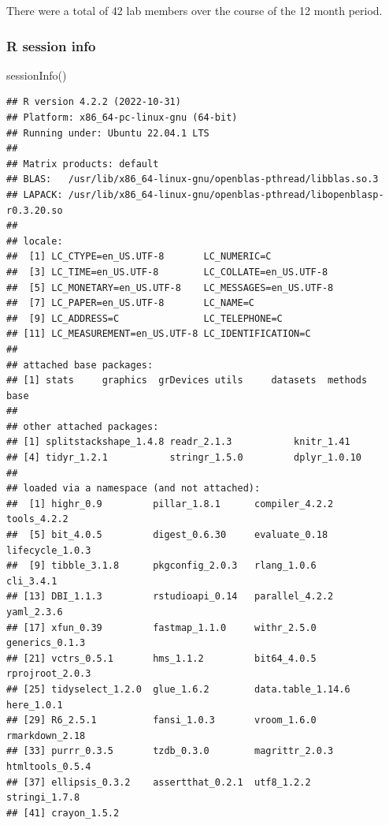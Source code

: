 \documentclass[
]{article}
\newenvironment{Shaded}{\begin{snugshade}}{\end{snugshade}}
\newcommand{\FunctionTok}[1]{\textcolor[rgb]{0.00,0.00,0.00}{#1}}
\newcommand{\NormalTok}[1]{#1}
\begin{document}
There were a total of 42 lab members over the course of the 12 month
period.

\hypertarget{r-session-info}{%
\subsubsection{R session info}\label{r-session-info}}

\begin{Shaded}
\begin{Highlighting}[]
\FunctionTok{sessionInfo}\NormalTok{()}
\end{Highlighting}
\end{Shaded}

\begin{verbatim}
## R version 4.2.2 (2022-10-31)
## Platform: x86_64-pc-linux-gnu (64-bit)
## Running under: Ubuntu 22.04.1 LTS
## 
## Matrix products: default
## BLAS:   /usr/lib/x86_64-linux-gnu/openblas-pthread/libblas.so.3
## LAPACK: /usr/lib/x86_64-linux-gnu/openblas-pthread/libopenblasp-r0.3.20.so
## 
## locale:
##  [1] LC_CTYPE=en_US.UTF-8       LC_NUMERIC=C              
##  [3] LC_TIME=en_US.UTF-8        LC_COLLATE=en_US.UTF-8    
##  [5] LC_MONETARY=en_US.UTF-8    LC_MESSAGES=en_US.UTF-8   
##  [7] LC_PAPER=en_US.UTF-8       LC_NAME=C                 
##  [9] LC_ADDRESS=C               LC_TELEPHONE=C            
## [11] LC_MEASUREMENT=en_US.UTF-8 LC_IDENTIFICATION=C       
## 
## attached base packages:
## [1] stats     graphics  grDevices utils     datasets  methods   base     
## 
## other attached packages:
## [1] splitstackshape_1.4.8 readr_2.1.3           knitr_1.41           
## [4] tidyr_1.2.1           stringr_1.5.0         dplyr_1.0.10         
## 
## loaded via a namespace (and not attached):
##  [1] highr_0.9         pillar_1.8.1      compiler_4.2.2    tools_4.2.2      
##  [5] bit_4.0.5         digest_0.6.30     evaluate_0.18     lifecycle_1.0.3  
##  [9] tibble_3.1.8      pkgconfig_2.0.3   rlang_1.0.6       cli_3.4.1        
## [13] DBI_1.1.3         rstudioapi_0.14   parallel_4.2.2    yaml_2.3.6       
## [17] xfun_0.39         fastmap_1.1.0     withr_2.5.0       generics_0.1.3   
## [21] vctrs_0.5.1       hms_1.1.2         bit64_4.0.5       rprojroot_2.0.3  
## [25] tidyselect_1.2.0  glue_1.6.2        data.table_1.14.6 here_1.0.1       
## [29] R6_2.5.1          fansi_1.0.3       vroom_1.6.0       rmarkdown_2.18   
## [33] purrr_0.3.5       tzdb_0.3.0        magrittr_2.0.3    htmltools_0.5.4  
## [37] ellipsis_0.3.2    assertthat_0.2.1  utf8_1.2.2        stringi_1.7.8    
## [41] crayon_1.5.2
\end{verbatim}
\end{document}
